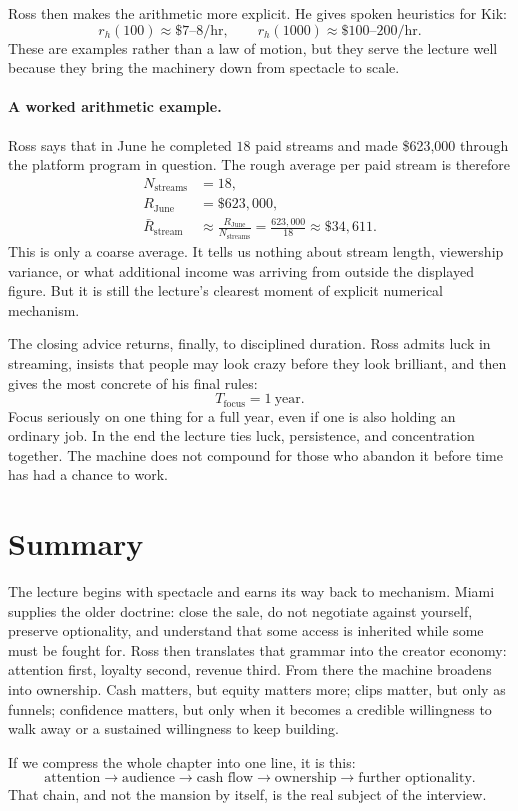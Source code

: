 Ross then makes the arithmetic more explicit. He gives spoken heuristics for Kik:
\begin{equation}
r_h(100) \approx \$7\text{--}8/\text{hr},\qquad
r_h(1000) \approx \$100\text{--}200/\text{hr}.
\end{equation}
These are examples rather than a law of motion, but they serve the lecture well because they bring the machinery down from spectacle to scale.

\paragraph{A worked arithmetic example.} Ross says that in June he completed \(18\) paid streams and made \$623{,}000 through the platform program in question. The rough average per paid stream is therefore
\begin{align}
N_{\text{streams}} &= 18,\\
R_{\text{June}} &= \$623{,}000,\\
\bar R_{\text{stream}}
&\approx \frac{R_{\text{June}}}{N_{\text{streams}}}
= \frac{623{,}000}{18}
\approx \$34{,}611.
\end{align}
This is only a coarse average. It tells us nothing about stream length, viewership variance, or what additional income was arriving from outside the displayed figure. But it is still the lecture's clearest moment of explicit numerical mechanism.

The closing advice returns, finally, to disciplined duration. Ross admits luck in streaming, insists that people may look crazy before they look brilliant, and then gives the most concrete of his final rules:
\begin{equation}
T_{\text{focus}} = 1\ \text{year}.
\end{equation}
Focus seriously on one thing for a full year, even if one is also holding an ordinary job. In the end the lecture ties luck, persistence, and concentration together. The machine does not compound for those who abandon it before time has had a chance to work.

\section{Summary}

The lecture begins with spectacle and earns its way back to mechanism. Miami supplies the older doctrine: close the sale, do not negotiate against yourself, preserve optionality, and understand that some access is inherited while some must be fought for. Ross then translates that grammar into the creator economy: attention first, loyalty second, revenue third. From there the machine broadens into ownership. Cash matters, but equity matters more; clips matter, but only as funnels; confidence matters, but only when it becomes a credible willingness to walk away or a sustained willingness to keep building.

If we compress the whole chapter into one line, it is this:
\[
\text{attention} \to \text{audience} \to \text{cash flow} \to \text{ownership} \to \text{further optionality}.
\]
That chain, and not the mansion by itself, is the real subject of the interview.